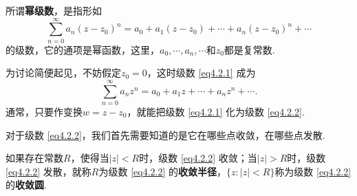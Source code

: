 所谓\textbf{幂级数}，是指形如
\begin{equation}\label{eq4.2.1}
  \sum_{n=0}^\infty a_n(z-z_0)^n = a_0 + a_1(z-z_0) + \cdots + a_n(z-z_0)^n + \cdots
\end{equation}
的级数，它的通项是幂函数，这里，$a_0,\cdots,a_n,\cdots$和$z_0$都是复常数.

为讨论简便起见，不妨假定$z_0=0$，这时级数 \eqref{eq4.2.1} 成为
\begin{equation}\label{eq4.2.2}
  \sum_{n=0}^\infty a_nz^n = a_0 + a_1z + \cdots + a_nz^n +\cdots.
\end{equation}
通常，只要作变换$w=z-z_0$，就能把级数 \eqref{eq4.2.1} 化为级数 \eqref{eq4.2.2}.

对于级数 \eqref{eq4.2.2}，我们首先需要知道的是它在哪些点收敛，在哪些点发散.
\begin{definition}\label{def4.2.1}
  如果存在常数$R$，使得当$|z|<R$时，级数 \eqref{eq4.2.2} 收敛；当$|z|>R$时，级数 \eqref{eq4.2.2} 发散，就称$R$为级数 \eqref{eq4.2.2} 的\textbf{收敛半径}，$\{z:|z|<R\}$称为级数 \eqref{eq4.2.2} 的\textbf{收敛圆}.
\end{definition}

